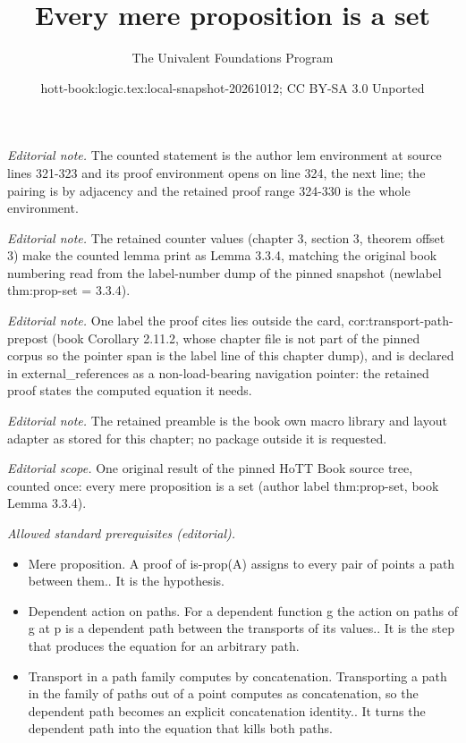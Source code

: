 \documentclass[10pt,a4paper]{article}
\title{Every mere proposition is a set}
\author{The Univalent Foundations Program}
\date{hott-book:logic.tex:local-snapshot-20261012; CC BY-SA 3.0 Unported}
\newcounter{chapter}
\theoremstyle{definition}
\theoremstyle{remark}
\numberwithin{equation}{section}
\begin{document}
\maketitle
\setcounter{chapter}{3}
\setcounter{section}{3}
\setcounter{thm}{3}
\noindent\textit{Editorial note.} The counted statement is the author lem environment at source lines 321-323 and its proof environment opens on line 324, the next line; the pairing is by adjacency and the retained proof range 324-330 is the whole environment.\par\medskip
\noindent\textit{Editorial note.} The retained counter values (chapter 3, section 3, theorem offset 3) make the counted lemma print as Lemma 3.3.4, matching the original book numbering read from the label-number dump of the pinned snapshot (newlabel thm:prop-set = 3.3.4).\par\medskip
\noindent\textit{Editorial note.} One label the proof cites lies outside the card, cor:transport-path-prepost (book Corollary 2.11.2, whose chapter file is not part of the pinned corpus so the pointer span is the label line of this chapter dump), and is declared in external\_references as a non-load-bearing navigation pointer: the retained proof states the computed equation it needs.\par\medskip
\noindent\textit{Editorial note.} The retained preamble is the book own macro library and layout adapter as stored for this chapter; no package outside it is requested.\par\medskip
\noindent\textit{Editorial scope.} One original result of the pinned HoTT Book source tree, counted once: every mere proposition is a set (author label thm:prop-set, book Lemma 3.3.4).\par\medskip
\noindent\textit{Allowed standard prerequisites (editorial).}\begin{itemize}
\item Mere proposition. A proof of is-prop(A) assigns to every pair of points a path between them.. It is the hypothesis.
\item Dependent action on paths. For a dependent function g the action on paths of g at p is a dependent path between the transports of its values.. It is the step that produces the equation for an arbitrary path.
\item Transport in a path family computes by concatenation. Transporting a path in the family of paths out of a point computes as concatenation, so the dependent path becomes an explicit concatenation identity.. It turns the dependent path into the equation that kills both paths.
\end{itemize}\medskip
\end{document}
